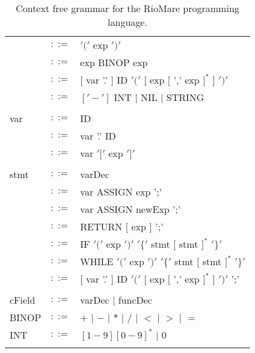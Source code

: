 \documentclass{article}
\begin{document}
\begin{table}[h]
\begin{tabular}{ l c l }
         & $::=$ & $'('$ exp $')'$                                                \\
         & $::=$ & exp BINOP exp                                                  \\
         & $::=$ & $[$ var '.' $]$ ID $'('$ $[$ exp $[$ ',' exp $]^{*}$ $]$ $')'$ \\
         & $::=$ & $['-']$ INT $|$ NIL $|$ STRING                                 \\
\\
var      & $::=$ & ID                  \\
         & $::=$ & var '.' ID          \\
         & $::=$ & var $'['$ exp $']'$ \\
\\  
stmt     & $::=$ & varDec                                                             \\
         & $::=$ & var ASSIGN exp ';'                                                 \\
         & $::=$ & var ASSIGN newExp ';'                                              \\
         & $::=$ & RETURN $[$ exp $]$ ';'                                             \\
         & $::=$ & IF $'('$ exp $')'$ $'\{'$ stmt $[$ stmt $]^{*}$ $'\}'$             \\
         & $::=$ & WHILE $'('$ exp $')'$ $'\{'$ stmt $[$ stmt $]^{*}$ $'\}'$          \\
         & $::=$ & $[$ var '.' $]$ ID $'('$ $[$ exp $[$ ',' exp $]^{*}$ $]$ $')'$ ';' \\
\\
cField   & $::=$ & varDec $|$ funcDec \\
BINOP    & $::=$ & $+$ $|$ $-$ $|$ $*$ $|$ $/$ $|$ $<$ $|$ $>$ $|$ $=$ \\
INT      & $::=$ & $[1-9][0-9]^{*}$ $|$ $0$                            \\
\\
\end{tabular}
\caption{
Context free grammar for the RioMare programming language.
\label{Table_CFG_Of_RioMare}}
\end{table}
\end{document}
